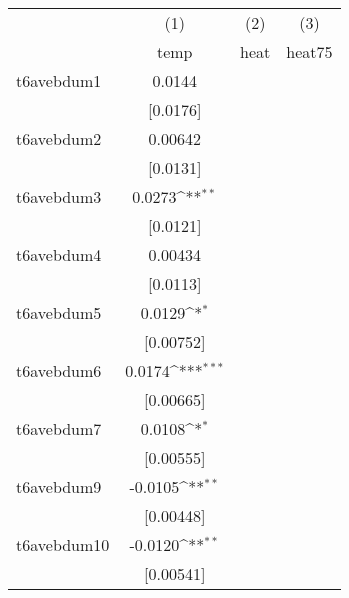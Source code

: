 {
\def\sym#1{\ifmmode^{#1}\else\(^{#1}\)\fi}
\begin{tabular}{l*{3}{c}}
\hline\hline
            &\multicolumn{1}{c}{(1)}&\multicolumn{1}{c}{(2)}&\multicolumn{1}{c}{(3)}\\
            &\multicolumn{1}{c}{temp}&\multicolumn{1}{c}{heat}&\multicolumn{1}{c}{heat75}\\
\hline
t6avebdum1  &      0.0144         &                     &                     \\
            &    [0.0176]         &                     &                     \\
[1em]
t6avebdum2  &     0.00642         &                     &                     \\
            &    [0.0131]         &                     &                     \\
[1em]
t6avebdum3  &      0.0273\sym{**} &                     &                     \\
            &    [0.0121]         &                     &                     \\
[1em]
t6avebdum4  &     0.00434         &                     &                     \\
            &    [0.0113]         &                     &                     \\
[1em]
t6avebdum5  &      0.0129\sym{*}  &                     &                     \\
            &   [0.00752]         &                     &                     \\
[1em]
t6avebdum6  &      0.0174\sym{***}&                     &                     \\
            &   [0.00665]         &                     &                     \\
[1em]
t6avebdum7  &      0.0108\sym{*}  &                     &                     \\
            &   [0.00555]         &                     &                     \\
[1em]
t6avebdum9  &     -0.0105\sym{**} &                     &                     \\
            &   [0.00448]         &                     &                     \\
[1em]
t6avebdum10 &     -0.0120\sym{**} &                     &                     \\
            &   [0.00541]         &                     &                     \\

\end{tabular}}
